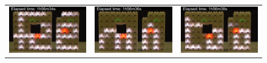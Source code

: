 {\begin{figure}[h!]
\begin{tabular}{c c c}
			\includegraphics[width=\subFigureWidth]{images/time-synchronization/scroller/sync_1h56m34s} &
			\includegraphics[width=\subFigureWidth]{images/time-synchronization/scroller/sync_1h56m36s} &
			\includegraphics[width=\subFigureWidth]{images/time-synchronization/scroller/sync_1h56m38s} \\
			

\end{tabular}
\end{figure}}
